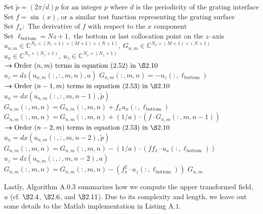 \begin{algorithm}                     
\begin{algorithmic}[1]
\State $\text{Set $\tilde{p}=(2\pi/d)p$ for an integer $p$ where $d$ is the periodicity of the grating interface}$
\State $\text{Set $f=\sin(x)$, or a similar test function representing the grating surface}$
\State $\text{Set $f_x:$ The derivative of $f$ with respect to the $x$ component}$
\State $\text{Set $\ell_{\text{bottom}}=Nz+1,$ the bottom or last collocation point on the $z$--axis}$
\State $u_{n,m}\in\mathbb C^{N_x\times (N_z+1) \times (M+1) \times (N+1)}, ~ G_{n,m} \in\mathbb C^{N_x\times (M+1) \times (N+1)} $
\State $u_x\in\mathbb C^{N_x \times (N_z+1)}, ~ u_z \in\mathbb C^{N_x \times (N_z+1)}$
 ${\boldsymbol{\rightarrow} \text{Order $(n,m)$ terms in equation $(2.52)$ in $\S 2.10 $}}$
\State $u_z = dz(u_{n,m}(:,:,m,n),a)$
\State $G_{n,m}(:,m,n) = -u_z(:,\ell_{\text{bottom}}) $
 ${\boldsymbol{\rightarrow} \text{Order $(n-1,m)$ terms in equation $(2.53)$ in $\S 2.10 $}}$
\State $u_x = dx(u_{n,m}(:,:,m,n-1),\tilde{p})$
\State $G_{n,m}(:,m,n) = G_{n,m}(:,m,n) + f_xu_x(:,\ell_{\text{bottom}})$
\State $G_{n,m}(:,m,n) = G_{n,m}(:,m,n) + (1/a)\cdot (f\cdot G_{n,m}(:,m,n-1))$
\EndIf
{} ${\boldsymbol{\rightarrow} \text{Order $(n-2,m)$ terms in equation $(2.53)$ in $\S 2.10 $}}$
\State $u_x = dx(u_{n,m}(:,:,m,n-2),\tilde{p})$
\State $G_{n,m}(:,m,n) = G_{n,m}(:,m,n) - (1/a)\cdot(ff_x\cdot u_x(:,\ell_{\text{bottom}}))$
\State $u_z = dz(u_{n,m}(:,:,m,n-2),a)$
\State $G_{n,m}(:,m,n) = G_{n,m}(:,m,n) - (f_x^2\cdot u_z(:,\ell_{\text{bottom}}))$
\EndIf
\EndFor
\EndFor
\State\Return $G_{n,m}$
\end{algorithmic}
\end{algorithm}
\vspace{-18mm}
Lastly, Algorithm $\text{A}.0.3$ summarizes how we compute the upper transformed field, $u$ (cf. $\S 2.4$, $\S 2.6$, and $\S 2.11$). Due to its complexity and length, we leave out some details to the Matlab implementation in Listing $\text{A}.1$. 
\vspace{-14mm}
